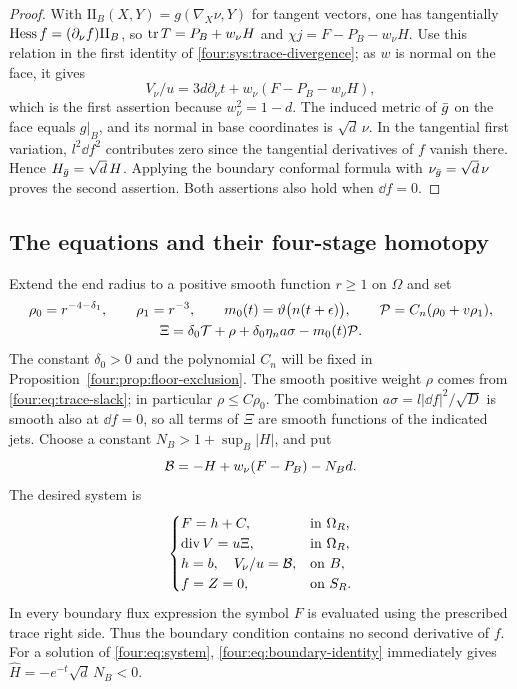 \begin{proof}
With $\mathrm{II}_B(X,Y)=g(\nabla_X\nu,Y)$ for tangent vectors,
one has tangentially $\operatorname{Hess} f=(\partial_\nu f)\mathrm{II}_B$, so
$\operatorname{tr} T=P_B+w_\nu H$ and
$\chi j=F-P_B-w_\nu H$.  Use this relation in the first identity of
\eqref{four:sys:trace-divergence}; as $w$ is normal on the face, it gives
\[
 V_\nu/u=3d\partial_\nu t+w_\nu(F-P_B-w_\nu H),
\]
which is the first assertion because $w_\nu^2=1-d$.  The induced
metric of $\bar g$ on the face equals $g|_B$, and its normal in base
coordinates is $\sqrt d\,\nu$.  In the tangential first variation,
$l^2\dd f^2$ contributes zero since the tangential derivatives of $f$
vanish there.  Hence $H_{\bar g}=\sqrt d\,H$.  Applying the boundary
conformal formula with $\nu_{\bar g}=\sqrt d\,\nu$ proves the second
assertion.  Both assertions also hold when $\dd f=0$.
\end{proof}

\subsection{The equations and their four-stage homotopy}

Extend the end radius to a positive smooth function $r\ge1$ on $\Omega$
and set
\begin{equation}\label{four:sys:source}
\begin{gathered}
 \rho_0=r^{-4-\delta_1},\qquad \rho_1=r^{-3},\qquad
 m_0(t)=\vartheta\bigl(n(t+\epsilon)\bigr),\qquad
 \mathcal P=C_n(\rho_0+v\rho_1),\\
 \Xi=\delta_0\mathcal T+\rho+\delta_0\eta_n a\sigma-m_0(t)\mathcal P.
\end{gathered}
\end{equation}
The constant $\delta_0>0$ and the polynomial $C_n$ will be fixed in
Proposition~\ref{four:prop:floor-exclusion}.  The smooth positive weight
$\rho$ comes from \eqref{four:eq:trace-slack}; in particular
$\rho\le C\rho_0$.  The combination
$a\sigma=l|\dd f|^2/\sqrt D$ is smooth also at $\dd f=0$, so all
terms of $\Xi$ are smooth functions of the indicated jets.
Choose a constant $N_B>1+\sup_B|H|$, and put
\[
 \mathcal B=-H+w_\nu(F-P_B)-N_Bd.
\]
The desired system is
\begin{equation}\label{four:eq:system}
\begin{cases}
 F=h+C, &\text{in }\Omega_R,\\
 \operatorname{div} V=u\Xi, &\text{in }\Omega_R,\\
 h=b,\quad V_\nu/u=\mathcal B, &\text{on }B,\\
 f=Z=0, &\text{on }S_R.
\end{cases}
\end{equation}
In every boundary flux expression the symbol $F$ is evaluated using the
prescribed trace right side.  Thus the boundary condition contains no
second derivative of $f$.  For a solution of \eqref{four:eq:system},
\eqref{four:eq:boundary-identity} immediately gives
$\widehat H=-e^{-t}\sqrt d\,N_B<0$.

